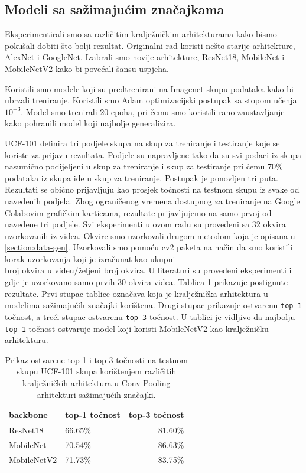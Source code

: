 \documentclass[times, utf8, diplomski,  numeric]{fer}
\begin{document}
\subsection{Modeli sa sažimajućim značajkama}
Eksperimentirali smo sa različitim kralježničkim arhitekturama kako bismo pokušali dobiti što bolji rezultat. Originalni rad \cite{feature-pooling} koristi nešto starije arhitekture, AlexNet i GoogleNet. Izabrali smo novije arhitekture, ResNet18, MobileNet i MobileNetV2 kako bi povećali šansu uspjeha.
\par
Koristili smo modele koji su predtrenirani na Imagenet skupu podataka kako bi ubrzali treniranje. Koristili smo Adam optimizacijski postupak sa stopom učenja $10^{-3}$. Model smo trenirali 20 epoha, pri čemu smo koristili rano zaustavljanje kako pohranili model koji najbolje generalizira.
\par
UCF-101 definira tri podjele skupa na skup za treniranje i testiranje koje se koriste za prijavu rezultata. Podjele su napravljene tako da su svi podaci iz skupa nasumično podijeljeni u skup za treniranje i skup za testiranje pri čemu 70\% podataka iz skupa ide u skup za treniranje. Postupak je ponovljen tri puta.  Rezultati se obično prijavljuju kao prosjek točnosti na testnom skupu iz svake od navedenih podjela. Zbog ograničenog vremena dostupnog za treniranje na Google Colabovim grafičkim karticama, rezultate prijavljujemo na samo prvoj od navedene tri podjele. Svi eksperimenti u ovom radu su provedeni sa 32 okvira uzorkovanih iz videa. Okvire smo uzorkovali drugom metodom koja je opisana u \ref{section:data-gen}. Uzorkovali smo pomoću cv2 paketa na način da smo koristili korak uzorkovanja koji je izračunat kao ukupni $\text{broj okvira u videu} / \text{željeni broj okvira}$. U literaturi \cite{feature-pooling} su provedeni eksperimenti i gdje je uzorkovano samo prvih 30 okvira videa. Tablica \ref{tbl:results} prikazuje postignute rezultate. Prvi stupac tablice označava koja je kralježnička arhitektura u modelima sažimajućih značajki korištena. Drugi stupac prikazuje ostvarenu \verb|top-1| točnost, a treći stupac ostvarenu \verb|top-3| točnost. U tablici je vidljivo da najbolju \verb|top-1| točnost ostvaruje model koji koristi MobileNetV2 kao kralježničku arhitekturu.
\begin{table}[htb]
\caption{Prikaz ostvarene top-1 i top-3 točnosti na testnom skupu UCF-101 skupa korištenjem različitih kralježničkih arhitektura u Conv Pooling arhitekturi sažimajućih značajki.}
\label{tbl:results}
\centering
\begin{tabular}{llr} \\ \toprule
backbone & top-1 točnost & top-3 točnost \\ \midrule
$\text{ResNet18}$ & 66.65\% & 81.60\% \\
$\text{MobileNet}$ & 70.54\% & 86.63\% \\
$\text{MobileNetV2}$ & 71.73\% & 83.75\% \\ \bottomrule
\end{tabular}
\end{table}
\end{document}
